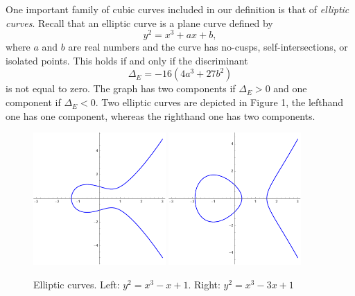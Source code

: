 \documentclass{amsart}
\theoremstyle{remark}
\begin{document}
One important family of cubic curves included in our definition is that of {\it elliptic curves}. 
Recall that an elliptic curve is a plane curve defined by 
\begin{equation} \label{eq:elliptic1}
     y^2 = x^3 + a x + b, 
\end{equation}
where $a$ and $b$ are real numbers and the curve has no-cusps, self-intersections, or isolated points. This 
holds if and only if the discriminant
$$
\Delta_E = -16(4a^{3}+27b^{2})
$$
is not equal to zero. The graph has two components if $\Delta_E > 0$ and one component if $\Delta_E < 0$.
Two elliptic curves are depicted in Figure 1, the lefthand one has one component, whereas the righthand one 
has two components. 
\begin{figure}[ht]
  \begin{center}
    \includegraphics[width=0.45\textwidth]{elliptic1} \qquad \includegraphics[width=0.45\textwidth]{elliptic2}
  \end{center} 
  \caption{Elliptic curves. Left: $y^2=x^3-x+1$. Right: $y^2=x^3-3x+1$}
\end{figure}
\end{document}
